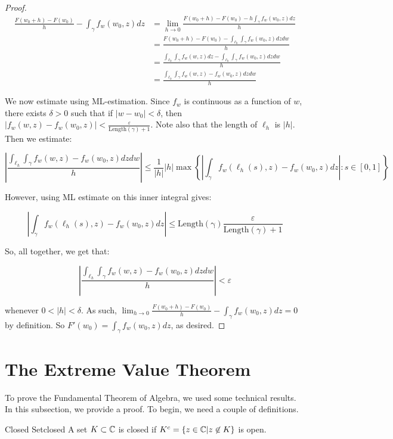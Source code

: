 \begin{proof}
\begin{align*}\frac{F(w_0+h) - F(w_0)}{h} - \int_{\gamma} f_w(w_0,z)dz&= \lim_{h\rightarrow 0} \frac{F(w_0+h) - F(w_0) - h\int_\gamma f_w(w_0,z)dz}{h}\\
&=  \frac{F(w_0+h) - F(w_0) - \int_{\ell_h}\int_\gamma f_w(w_0,z)dzdw}{h}\\
&=  \frac{\int_{\ell_h}\int_\gamma f_w(w,z)dz - \int_{\ell_h}\int_\gamma f_w(w_0,z)dzdw}{h}\\
&=  \frac{\int_{\ell_h}\int_\gamma f_w(w,z) - f_w(w_0,z)dzdw}{h}
\end{align*}

We now estimate using ML-estimation. Since $f_w$ is continuous as a function of $w$, there exists $\delta > 0$ such that if $|w-w_0| < \delta$, then $|f_w(w,z) - f_w(w_0,z)| < \frac{\varepsilon}{\mathrm{Length}(\gamma)+1}$. Note also that the length of $\ell_h$ is $|h|$. Then we estimate:

$$\left| \frac{\int_{\ell_h}\int_\gamma f_w(w,z) - f_w(w_0,z)dzdw}{h} \right| \le \frac{1}{|h|}|h| \max\left\{\left|\int_\gamma f_w(\ell_h(s),z) - f_w(w_0,z)dz\right|: s\in[0,1]\right\}$$

However, using ML estimate on this inner integral gives:

$$\left|\int_\gamma f_w(\ell_h(s),z) - f_w(w_0,z)dz\right| \le \mathrm{Length(\gamma)}\frac{\varepsilon}{\mathrm{Length}(\gamma)+1	}$$

So, all together, we get that:

$$\left| \frac{\int_{\ell_h}\int_\gamma f_w(w,z) - f_w(w_0,z)dzdw}{h} \right| < \varepsilon$$

\noindent whenever $0<|h| < \delta$. As such, $\lim_{h\rightarrow 0} \frac{F(w_0+h) - F(w_0)}{h} - \int_{\gamma} f_w(w_0,z)dz = 0$ by definition. So $F'(w_0) = \int_\gamma f_w(w_0,z)dz$, as desired.



\end{proof}




\section{The Extreme Value Theorem}\label{subsec:FTA}

To prove the Fundamental Theorem of Algebra, we used some technical results. In this subsection, we provide a proof. To begin, we need a couple of definitions.

\begin{defbo}{Closed Set}{closed}
A set $K\subset \mathbb{C}$ is closed if $K^{c} = \{z\in \mathbb{C}|z\not\in K\}$ is open.\end{defbo}

